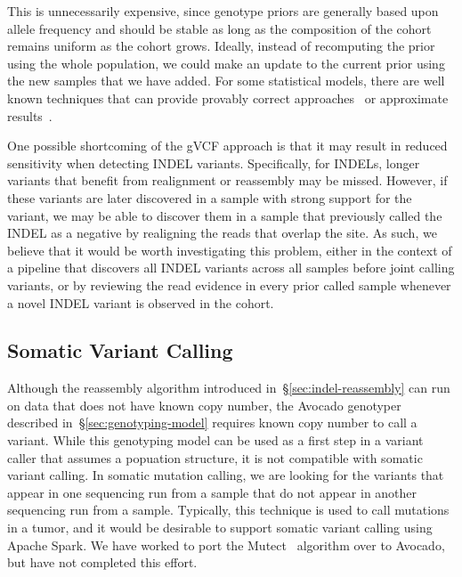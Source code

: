 \documentclass[phd]{ucbthesis}
\begin{document}
This is unnecessarily expensive, since genotype priors are generally based upon
allele frequency and should be stable as long as the composition of the cohort
remains uniform as the cohort grows. Ideally, instead of recomputing the prior
using the whole population, we could make an update to the current prior using
the new samples that we have added. For some statistical models, there are well
known techniques that can provide provably correct approaches~\cite{sherman50}
or approximate results~\cite{meng16}.

One possible shortcoming of the gVCF approach is that it may result in reduced
sensitivity when detecting INDEL variants. Specifically, for INDELs, longer
variants that benefit from realignment or reassembly may be missed. However, if
these variants are later discovered in a sample with strong support for the
variant, we may be able to discover them in a sample that previously called the
INDEL as a negative by realigning the reads that overlap the site. As such, we
believe that it would be worth investigating this problem, either in the context
of a pipeline that discovers all INDEL variants across all samples before joint
calling variants, or by reviewing the read evidence in every prior called sample
whenever a novel INDEL variant is observed in the cohort.

\subsection{Somatic Variant Calling}
\label{sec:somatic-variant-calling}

Although the reassembly algorithm introduced in~\S\ref{sec:indel-reassembly} can
run on data that does not have known copy number, the {Avocado} genotyper
described in~\S\ref{sec:genotyping-model} requires known copy number to call a
variant. While this genotyping model can be used as a first step in a variant
caller that assumes a popuation structure, it is not compatible with somatic
variant calling. In somatic mutation calling, we are looking for the variants
that appear in one sequencing run from a sample that do not appear in another
sequencing run from a sample. Typically, this technique is used to call mutations
in a tumor, and it would be desirable to support somatic variant calling using
{Apache Spark}. We have worked to port the
{Mutect}~\cite{cibulskis13} algorithm over to {Avocado}, but have
not completed this effort.
\end{document}
